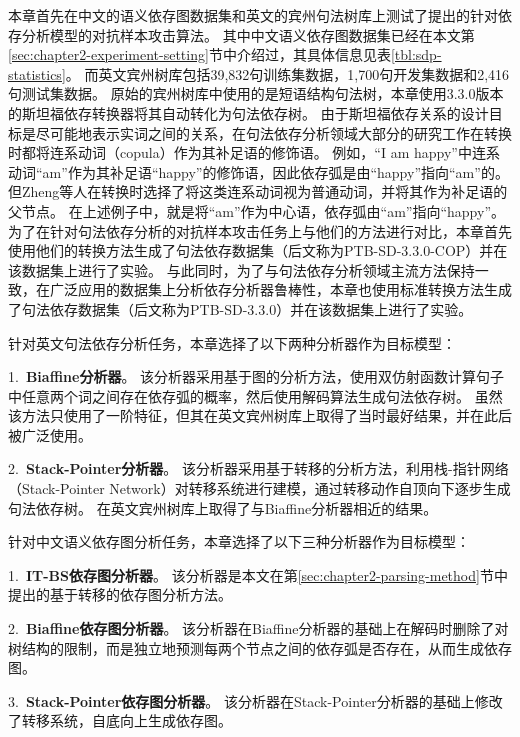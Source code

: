 本章首先在中文的语义依存图数据集和英文的宾州句法树库\cite{marcus-etal-1993-building}上测试了提出的针对依存分析模型的对抗样本攻击算法。
其中中文语义依存图数据集已经在本文第\ref{sec:chapter2-experiment-setting}节中介绍过，其具体信息见表\ref{tbl:sdp-statistics}。
而英文宾州树库包括39,832句训练集数据，1,700句开发集数据和2,416句测试集数据。
原始的宾州树库中使用的是短语结构句法树，本章使用3.3.0版本的斯坦福依存转换器\cite{de-etal-2006-generating}将其自动转化为句法依存树。
由于斯坦福依存关系的设计目标是尽可能地表示实词之间的关系，在句法依存分析领域大部分的研究工作在转换时都将连系动词（copula）作为其补足语的修饰语。
例如，“I am happy”中连系动词“am”作为其补足语“happy”的修饰语，因此依存弧是由“happy”指向“am”的。
但Zheng等人\cite{zheng-etal-2020-evaluating}在转换时选择了将这类连系动词视为普通动词，并将其作为补足语的父节点。
在上述例子中，就是将“am”作为中心语，依存弧由“am”指向“happy”。
为了在针对句法依存分析的对抗样本攻击任务上与他们的方法进行对比，本章首先使用他们的转换方法生成了句法依存数据集（后文称为PTB-SD-3.3.0-COP）并在该数据集上进行了实验。
与此同时，为了与句法依存分析领域主流方法保持一致，在广泛应用的数据集上分析依存分析器鲁棒性，本章也使用标准转换方法生成了句法依存数据集（后文称为PTB-SD-3.3.0）并在该数据集上进行了实验。

针对英文句法依存分析任务，本章选择了以下两种分析器作为目标模型：

1.\ \textbf{Biaffine分析器}\cite{dozat-etal-2017-deep}。
该分析器采用基于图的分析方法，使用双仿射函数计算句子中任意两个词之间存在依存弧的概率，然后使用解码算法生成句法依存树。
虽然该方法只使用了一阶特征，但其在英文宾州树库上取得了当时最好结果，并在此后被广泛使用。

2.\ \textbf{Stack-Pointer分析器}\cite{ma-etal-2018-stack}。
该分析器采用基于转移的分析方法，利用栈-指针网络（Stack-Pointer Network）对转移系统进行建模，通过转移动作自顶向下逐步生成句法依存树。
在英文宾州树库上取得了与Biaffine分析器相近的结果。

针对中文语义依存图分析任务，本章选择了以下三种分析器作为目标模型：

1.\ \textbf{IT-BS依存图分析器}。
该分析器是本文在第\ref{sec:chapter2-parsing-method}节中提出的基于转移的依存图分析方法。

2.\ \textbf{Biaffine依存图分析器}\cite{dozat-manning-2018-simpler}。
该分析器在Biaffine分析器的基础上在解码时删除了对树结构的限制，而是独立地预测每两个节点之间的依存弧是否存在，从而生成依存图。

3.\ \textbf{Stack-Pointer依存图分析器}\cite{fernandez-etal-2020-transition}。
该分析器在Stack-Pointer分析器的基础上修改了转移系统，自底向上生成依存图。

